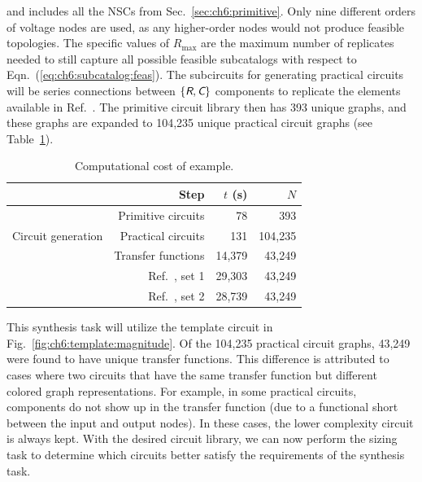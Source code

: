 \noindent and includes all the NSCs from Sec.~\ref{sec:ch6:primitive}.
Only nine different orders of voltage nodes are used, as any higher-order nodes would not produce feasible topologies.
The specific values of $R_{\max}$ are the maximum number of replicates needed to still capture all possible feasible subcatalogs with respect to Eqn.~(\ref{eq:ch6:subcatalog:feas}).
The subcircuits for generating practical circuits will be series connections between $\{\textsl{\textsf{R}}, \textsl{\textsf{C}}\}$ components to replicate the elements available in Ref.~\cite{Grimbleby1995a}.
The primitive circuit library then has 393 unique graphs, and these graphs are expanded to 104,235 unique practical circuit graphs (see Table~\ref{tb:ch6:mm1:computational}).

\begin{table}[ht]
\centering
\caption{Computational cost of  example.\label{tb:ch6:mm1:computational}}
\begin{tabular}{rrrr}
\hline \hline
                                    & Step                   & $t$ (s) & $N$ \\
\hline
\multirow{3}{*}{Circuit generation} & Primitive circuits     & 78 &  393 \\
                                    & Practical circuits     & 131  & 104,235  \\
                                    & Transfer functions     & 14,379  & 43,249   \\
 \arrayrulecolor{gray}\hline\arrayrulecolor{black}
 \multirow{2}{*}{Evaluation}        & Ref.~\cite{Grimbleby1995a}, set 1 & 29,303  & 43,249    \\
 & Ref.~\cite{Grimbleby1995a}, set 2 & 28,739  & 43,249    \\
\hline \hline
\end{tabular}
\end{table}

This synthesis task will utilize the template circuit in Fig.~\ref{fig:ch6:template:magnitude}.
Of the 104,235 practical circuit graphs, 43,249 were found to have unique transfer functions.
This difference is attributed to cases where two circuits that have the same transfer function but different colored graph representations.
For example, in some practical circuits, components do not show up in the transfer function (due to a functional short between the input and output nodes).
In these cases, the lower complexity circuit is always kept.
With the desired circuit library, we can now perform the sizing task to determine which circuits better satisfy the requirements of the synthesis task.


